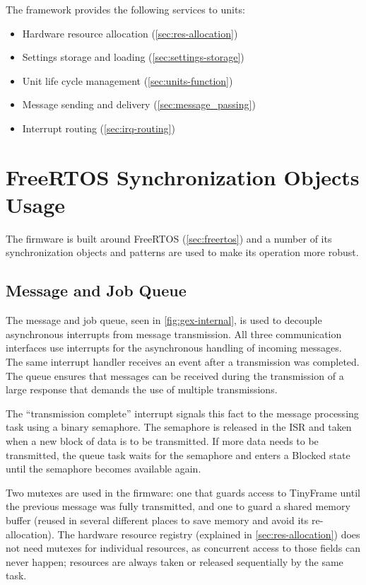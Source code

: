 \noindent
The framework provides the following services to units:

\begin{itemize}
	\item Hardware resource allocation (\cref{sec:res-allocation})
	\item Settings storage and loading (\cref{sec:settings-storage})
	\item Unit life cycle management (\cref{sec:units-function})
	\item Message sending and delivery (\cref{sec:message_passing})
	\item Interrupt routing (\cref{sec:irq-routing})
\end{itemize}

\section{FreeRTOS Synchronization Objects Usage} \label{sec:rtos-in-gex}

The firmware is built around FreeRTOS (\cref{sec:freertos}) and a number of its synchronization objects and patterns are used to make its operation more robust.

\subsection{Message and Job Queue}

The message and job queue, seen in \cref{fig:gex-internal}, is used to decouple asynchronous interrupts from message transmission. All three communication interfaces use interrupts for the asynchronous handling of incoming messages. The same interrupt handler receives an event after a transmission was completed. The queue ensures that messages can be received during the transmission of a large response that demands the use of multiple transmissions.

The ``transmission complete'' interrupt signals this fact to the message processing task using a binary semaphore. The semaphore is released in the \gls{ISR} and taken when a new block of data is to be transmitted. If more data needs to be transmitted, the queue task waits for the semaphore and enters a Blocked state until the semaphore becomes available again.

Two mutexes are used in the firmware: one that guards access to TinyFrame until the previous message was fully transmitted, and one to guard a shared memory buffer (reused in several different places to save memory and avoid its re-allocation). The hardware resource registry (explained in \cref{sec:res-allocation}) does not need mutexes for individual resources, as concurrent access to those fields can never happen; resources are always taken or released sequentially by the same task.

